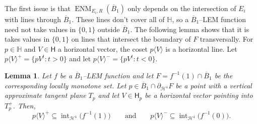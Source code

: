 \documentclass[11pt,reqno]{amsart}
\renewcommand{\H}{\mathbb{H}}
\newcommand{\cH}{\mathcal{H}}
\newcommand{\0}{\mathbf{0}}
\renewcommand{\1}{\mathbf 1}
\renewcommand{\mid}{:}
\renewcommand{\subset}{\subseteq}
\newtheorem{lemma}[thm]{Lemma}
\theoremstyle{remark}
\DeclareMathOperator{\ENM}{ENM}
\DeclareMathOperator{\inter}{int}
\begin{document}
The first issue is that $\ENM_{E_i,R}(\overline{B}_1)$ only depends on the intersection of $E_i$ with lines through $\overline{B}_1$.  These lines don't cover all of $\H$, so a $\overline{B}_1$--LEM function need not take values in $\{0,1\}$ outside $\overline{B}_1$.  The following lemma shows that it is takes values in $\{0,1\}$ on lines that intersect the boundary of $F$ transversally.  For $p \in \H$ and $V\in \mathsf{H}$ a horizontal vector, the coset $p\langle V\rangle$ is a horizontal line.  Let $p\langle V\rangle^+=\{pV^t\mid t>0\}$ and let $p\langle V\rangle^-=\{pV^t\mid t<0\}$.
\begin{lemma}\label{lem:monotone transverse intersections}
  Let $f$ be a $\overline{B}_1$--LEM function and let $F=f^{-1}(1)\cap \overline{B}_1$ be the corresponding locally monotone set.  Let $p\in \overline{B}_1\cap  \partial_{\cH^4} F $ be a point with a vertical approximate tangent plane $T_p$ and let $V\in \mathsf{H}_p$ be a horizontal vector pointing into $T_p^+$.  Then,
  \begin{equation}\label{eq:ray inclusions}
  p\langle V\rangle^+ \subset \inter_{\cH^4}\big( f^{-1}(1)\big)\qquad\mathrm{and}\qquad p\langle V\rangle^-\subset \inter_{\cH^4} \big(f^{-1}(0)\big).
  \end{equation}
\end{lemma}
\end{document}
